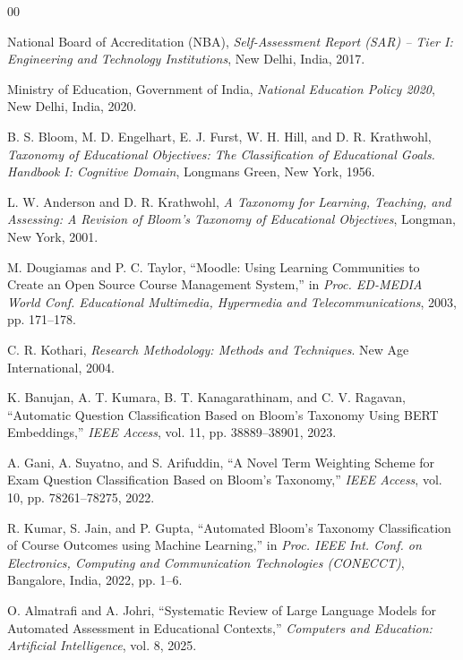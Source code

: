 \documentclass[conference]{IEEEtran}
\begin{document}
\begin{thebibliography}{00}

National Board of Accreditation (NBA), \textit{Self-Assessment Report (SAR) -- Tier I: Engineering and Technology Institutions}, New Delhi, India, 2017.

Ministry of Education, Government of India, \textit{National Education Policy 2020}, New Delhi, India, 2020.

B. S. Bloom, M. D. Engelhart, E. J. Furst, W. H. Hill, and D. R. Krathwohl, \textit{Taxonomy of Educational Objectives: The Classification of Educational Goals. Handbook I: Cognitive Domain}, Longmans Green, New York, 1956.

L. W. Anderson and D. R. Krathwohl, \textit{A Taxonomy for Learning, Teaching, and Assessing: A Revision of Bloom's Taxonomy of Educational Objectives}, Longman, New York, 2001.

M. Dougiamas and P. C. Taylor, ``Moodle: Using Learning Communities to Create an Open Source Course Management System,'' in \textit{Proc. ED-MEDIA World Conf. Educational Multimedia, Hypermedia and Telecommunications}, 2003, pp. 171--178.

C. R. Kothari, \textit{Research Methodology: Methods and Techniques}. New Age International, 2004.

K. Banujan, A. T. Kumara, B. T. Kanagarathinam, and C. V. Ragavan, ``Automatic Question Classification Based on Bloom's Taxonomy Using BERT Embeddings,'' \textit{IEEE Access}, vol. 11, pp. 38889--38901, 2023.

A. Gani, A. Suyatno, and S. Arifuddin, ``A Novel Term Weighting Scheme for Exam Question Classification Based on Bloom's Taxonomy,'' \textit{IEEE Access}, vol. 10, pp. 78261--78275, 2022.

R. Kumar, S. Jain, and P. Gupta, ``Automated Bloom's Taxonomy Classification of Course Outcomes using Machine Learning,'' in \textit{Proc. IEEE Int. Conf. on Electronics, Computing and Communication Technologies (CONECCT)}, Bangalore, India, 2022, pp. 1--6.

O. Almatrafi and A. Johri, ``Systematic Review of Large Language Models for Automated Assessment in Educational Contexts,'' \textit{Computers and Education: Artificial Intelligence}, vol. 8, 2025.


\end{thebibliography}
\end{document}
